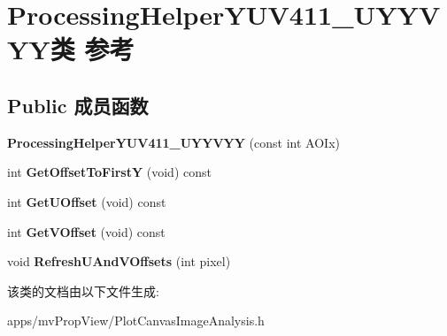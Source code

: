 \hypertarget{class_processing_helper_y_u_v411___u_y_y_v_y_y}{\section{Processing\+Helper\+Y\+U\+V411\+\_\+\+U\+Y\+Y\+V\+Y\+Y类 参考}
\label{class_processing_helper_y_u_v411___u_y_y_v_y_y}
}
\subsection*{Public 成员函数}
\begin{DoxyCompactItemize}
\item 
\hypertarget{class_processing_helper_y_u_v411___u_y_y_v_y_y_a540b9293d16a35ed37beaa3110cdba3e}{{\bfseries Processing\+Helper\+Y\+U\+V411\+\_\+\+U\+Y\+Y\+V\+Y\+Y} (const int A\+O\+Ix)}\label{class_processing_helper_y_u_v411___u_y_y_v_y_y_a540b9293d16a35ed37beaa3110cdba3e}

\item 
\hypertarget{class_processing_helper_y_u_v411___u_y_y_v_y_y_a5a8bbed3d49812ad7bfc6cb2f02cfb3f}{int {\bfseries Get\+Offset\+To\+First\+Y} (void) const }\label{class_processing_helper_y_u_v411___u_y_y_v_y_y_a5a8bbed3d49812ad7bfc6cb2f02cfb3f}

\item 
\hypertarget{class_processing_helper_y_u_v411___u_y_y_v_y_y_a5702c2d11c59663a07087e51a252ee37}{int {\bfseries Get\+U\+Offset} (void) const }\label{class_processing_helper_y_u_v411___u_y_y_v_y_y_a5702c2d11c59663a07087e51a252ee37}

\item 
\hypertarget{class_processing_helper_y_u_v411___u_y_y_v_y_y_aabf5ef9f4f62e0e3e5fc16a16beea461}{int {\bfseries Get\+V\+Offset} (void) const }\label{class_processing_helper_y_u_v411___u_y_y_v_y_y_aabf5ef9f4f62e0e3e5fc16a16beea461}

\item 
\hypertarget{class_processing_helper_y_u_v411___u_y_y_v_y_y_af4e5d302a8813560d9ebd3170ac6962b}{void {\bfseries Refresh\+U\+And\+V\+Offsets} (int pixel)}\label{class_processing_helper_y_u_v411___u_y_y_v_y_y_af4e5d302a8813560d9ebd3170ac6962b}

\end{DoxyCompactItemize}


该类的文档由以下文件生成\+:\begin{DoxyCompactItemize}
\item 
apps/mv\+Prop\+View/Plot\+Canvas\+Image\+Analysis.\+h\end{DoxyCompactItemize}
